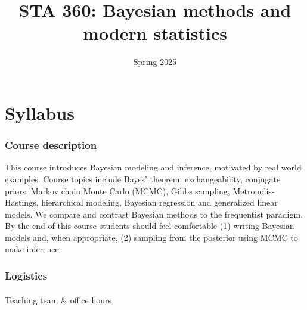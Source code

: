 \documentclass[
  letterpaper,
  DIV=11,
  numbers=noendperiod]{scrartcl}
\title{STA 360: Bayesian methods and modern statistics}
\subtitle{Spring 2025}
\author{}
\date{}
\makeatletter
\let\oldparagraph\paragraph
\renewcommand{\paragraph}{
    \@ifstar
      \xxxParagraphStar
      \xxxParagraphNoStar
  }
\newcommand{\xxxParagraphStar}[1]{\oldparagraph*{#1}\mbox{}}
\newcommand{\xxxParagraphNoStar}[1]{\oldparagraph{#1}\mbox{}}
\makeatother
\begin{document}
\maketitle


\section{Syllabus}\label{syllabus}

\subsubsection{Course description}\label{course-description}

This course introduces Bayesian modeling and inference, motivated by
real world examples. Course topics include Bayes' theorem,
exchangeability, conjugate priors, Markov chain Monte Carlo (MCMC),
Gibbs sampling, Metropolis-Hastings, hierarchical modeling, Bayesian
regression and generalized linear models. We compare and contrast
Bayesian methods to the frequentist paradigm. By the end of this course
students should feel comfortable (1) writing Bayesian models and, when
appropriate, (2) sampling from the posterior using MCMC to make
inference.

\subsubsection{Logistics}\label{logistics}

\paragraph{Teaching team \& office
hours}\label{teaching-team-office-hours}
\end{document}
